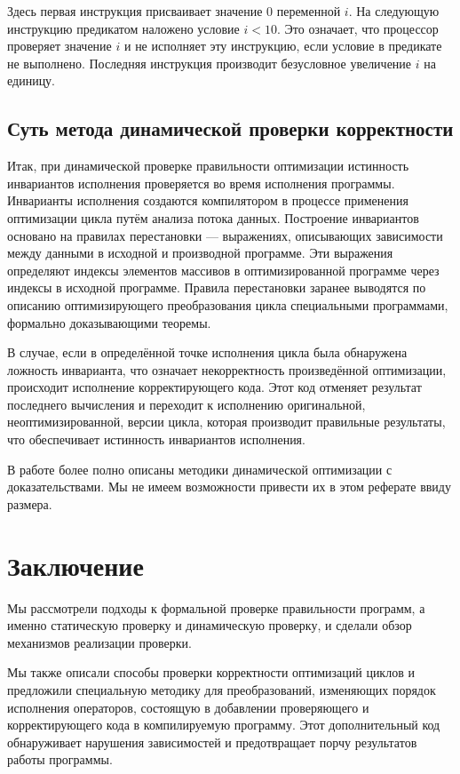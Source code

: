 Здесь первая инструкция присваивает значение $0$ переменной $i$. На следующую инструкцию предикатом наложено условие $i < 10$. Это означает, что процессор проверяет значение $i$ и не исполняет эту инструкцию, если условие в предикате не выполнено. Последняя инструкция производит безусловное увеличение $i$ на единицу.

\subsection{Суть метода динамической проверки корректности}
Итак, при динамической проверке правильности оптимизации истинность инвариантов исполнения проверяется во время исполнения программы. Инварианты исполнения создаются компилятором в процессе применения оптимизации цикла путём анализа потока данных. Построение инвариантов основано на правилах перестановки --- выражениях, описывающих зависимости между данными в исходной и производной программе. Эти выражения определяют индексы элементов массивов в оптимизированной программе через индексы в исходной программе. Правила перестановки заранее выводятся по описанию оптимизирующего преобразования цикла специальными программами, формально доказывающими теоремы.

В случае, если в определённой точке исполнения цикла была обнаружена ложность инварианта, что означает некорректность произведённой оптимизации, происходит исполнение корректирующего кода. Этот код отменяет результат последнего вычисления и переходит к исполнению оригинальной, неоптимизированной, версии цикла, которая производит правильные результаты, что обеспечивает истинность инвариантов исполнения.

В работе \cite{ZuckPFGH02} более полно описаны методики динамической оптимизации с доказательствами. Мы не имеем возможности привести их в этом реферате ввиду размера.

\section*{Заключение}
%

Мы рассмотрели подходы к формальной проверке правильности программ, а именно статическую проверку и динамическую проверку, и сделали обзор механизмов реализации проверки.

Мы также описали способы проверки корректности оптимизаций циклов и предложили специальную методику для преобразований, изменяющих порядок исполнения операторов, состоящую в добавлении проверяющего и корректирующего кода в компилируемую программу. Этот дополнительный код обнаруживает нарушения зависимостей и предотвращает порчу результатов работы программы.